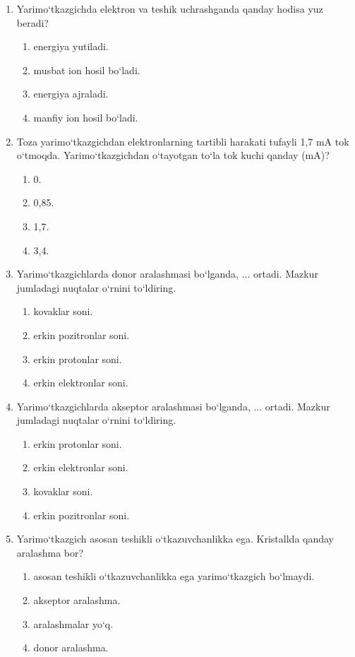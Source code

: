 \begin{enumerate}
\item Yarimo‘tkazgichda elektron va teshik uchrashganda qanday hodisa yuz beradi?
\begin{enumerate}[label=\Alph*)]
\item energiya yutiladi.
\item musbat ion hosil bo‘ladi.
\item energiya ajraladi.
\item manfiy ion hosil bo‘ladi.
\end{enumerate}

\item Toza yarimo‘tkazgichdan elektronlarning tartibli harakati tufayli 1,7 mA tok o‘tmoqda. Yarimo‘tkazgichdan o‘tayotgan to‘la tok kuchi qanday (mA)?
\begin{enumerate}[label=\Alph*)]
\item 0.
\item 0,85.
\item 1,7.
\item 3,4.
\end{enumerate}

\item Yarimo‘tkazgichlarda donor aralashmasi bo‘lganda, ... ortadi. Mazkur jumladagi nuqtalar o‘rnini to‘ldiring.
\begin{enumerate}[label=\Alph*)]
\item kovaklar soni.
\item erkin pozitronlar soni.
\item erkin protonlar soni.
\item erkin elektronlar soni.
\end{enumerate}

\item Yarimo‘tkazgichlarda akseptor aralashmasi bo‘lganda, ... ortadi. Mazkur jumladagi nuqtalar o‘rnini to‘ldiring.
\begin{enumerate}[label=\Alph*)]
\item erkin protonlar soni.
\item erkin elektronlar soni.
\item kovaklar soni.
\item erkin pozitronlar soni.
\end{enumerate}

\item Yarimo‘tkazgich asosan teshikli o‘tkazuvchanlikka ega. Kristallda qanday aralashma bor?
\begin{enumerate}[label=\Alph*)]
\item asosan teshikli o‘tkazuvchanlikka ega yarimo‘tkazgich bo‘lmaydi.
\item akseptor aralashma.
\item aralashmalar yo‘q.
\item donor aralashma.
\end{enumerate}


\end{enumerate}
